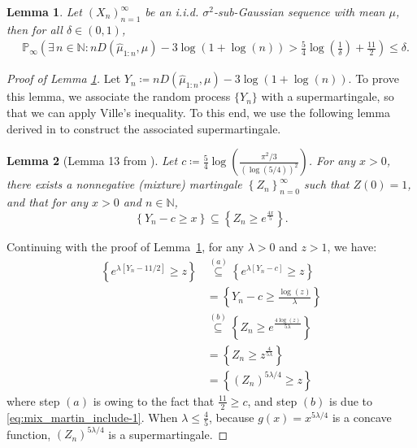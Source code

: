 \documentclass[12pt]{interact}
\newcommand{\lp}{\left(}
\newcommand{\rp}{\right)}
\newcommand{\lb}{\left[}
\newcommand{\rb}{\right]}
\newcommand{\lbp}{\left\{}
\newcommand{\rbp}{\right\}}
\newcommand{\mbb}{\mathbb}
\renewcommand{\Pr}{\mathbb{P}}
\theoremstyle{plain}
\newtheorem{lemma}{Lemma}
\newcommand{\yhh}[1]{{\color{purple}{#1}}}
\begin{document}
\begin{lemma} \label{lem:mix_martin}
Let $\lp X_{n}\rp_{n=1}^{\infty}$ be an i.i.d. $\sigma^{2}$-sub-Gaussian sequence with mean $\mu$, then for all $\delta\in\lp0,1\rp$,
%
\textup{\begin{align}
    &\Pr_{\infty}\lp\exists\,n\in\mbb{N}:n D \lp\hat{\mu}_{1:n},\mu\rp-3\log\lp1+\log\lp n\rp\rp>\frac{5}{4}\log\lp\frac{1}{\delta}\rp+\frac{11}{2}\rp\leq\delta.\label{eq:mix_mart}
\end{align}}
%
\end{lemma}
\begin{proof} [Proof of Lemma \ref{lem:mix_martin}]
Let $Y_{n} \coloneqq n D \lp\hat{\mu}_{1:n},\mu\rp-3\log\lp1+\log\lp n\rp\rp$. To prove this lemma, we associate the random process $\{Y_{n}\}$ with a supermartingale, so that we can apply Ville's inequality. To this end, we use the following lemma derived in \citep{kaufmann2021mixture} to construct the associated supermartingale. 
%
\begin{lemma}[Lemma 13 from \citep{kaufmann2021mixture}]
Let $c\coloneqq\frac{5}{4}\log\lp\frac{\pi^{2}/3}{\lp\log\lp5/4\rp\rp^{2}}\rp$. For any $x > 0$, there exists a nonnegative (mixture) martingale $\lbp Z_{n} \rbp_{n=0}^{\infty}$ such that $Z\lp 0 \rp=1$, and that for any $x>0$ and $n\in\mbb{N}$,
%
\begin{equation}
    \lbp Y_{n}-c\geq x\rbp\subseteq\lbp Z_{n}\geq e^{\frac{4x}{5}}\rbp\label{eq:mix_martin_include-1}.
\end{equation}
%
\end{lemma}
%
Continuing with the proof of Lemma~\ref{lem:mix_martin}, for any $\lambda>0$ and $z>1$, we have:
%
\begin{align}
    \lbp e^{\lambda\lb Y_{n}-11/2\rb}\geq z\rbp&\overset{(a)}{\subseteq}\lbp e^{\lambda\lb Y_{n}-c\rb}\geq z\rbp \nonumber\\
    &=\lbp Y_{n} - c\geq \frac{\log\lp z\rp}{\lambda}\rbp \nonumber\\
    &\overset{(b)}{\subseteq}\lbp Z_{n}\geq e^{\frac{4\log\lp z\rp}{5\lambda}}\rbp \nonumber\\
    &=\lbp Z_{n}\geq z^{\frac{4}{5\lambda}}\rbp \nonumber\\
    &=\lbp\lp Z_{n}\rp^{5\lambda/4}\geq z\rbp\label{eq:mix_martin_include-2}
\end{align}
%
where step $(a)$ is owing to the fact that $\frac{11}{2} \geq c$, and step $(b)$ is due to \eqref{eq:mix_martin_include-1}. When $\lambda\leq\frac{4}{5}$, because $g \lp x \rp = x^{5\lambda/4}$ is a concave function, $\lp Z_{n}\rp^{5\lambda/4}$ is a supermartingale.

\end{proof}
\end{document}
